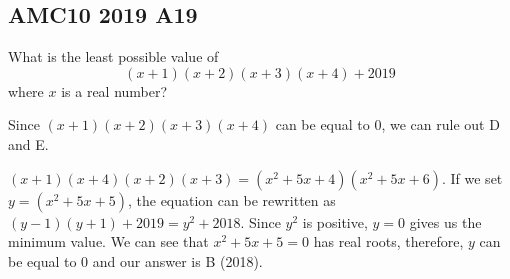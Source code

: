 \documentclass[12pt]{exam}
\begin{document}
\thispagestyle{empty}

\begin{center}\section*{AMC10 2019 A19}

\end{center}
\bigskip
\begin{questions}

\question 
What is the least possible value of \[(x + 1)(x + 2)(x + 3)(x + 4) + 2019\]
where $x$ is a real number?
\bigskip

\begin{oneparchoices}
\end{oneparchoices}

\vspace{0.5cm}
Since $(x + 1)(x + 2)(x + 3)(x + 4)$ can be equal to 0,
we can rule out D and E. 

\vspace{0.5cm}
$(x + 1)(x + 4)(x + 2)(x + 3) = 
(x^2 + 5x + 4)(x^2 + 5x + 6)$. If we set $y = (x^2 + 5x + 5)$, 
the equation can be rewritten as $(y - 1)(y + 1) + 2019 = y^2 + 2018$.
Since $y^2$ is positive, $y = 0$ gives us the minimum value. 
We can see that $x^2 + 5x + 5 = 0$ has real roots, therefore, $y$ can be
equal to 0 and our answer is B (2018).

\end{questions}
\end{document}
